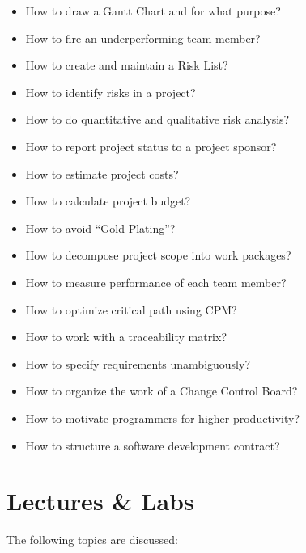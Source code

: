 \documentclass[nobrand,anonymous,nodate,nosecurity]{huawei}
\begin{document}
{\begin{itemize}
\item How to draw a Gantt Chart and for what purpose?
\item How to fire an underperforming team member?
\item How to create and maintain a Risk List?
\item How to identify risks in a project?
\item How to do quantitative and qualitative risk analysis?
\item How to report project status to a project sponsor?
\item How to estimate project costs?
\item How to calculate project budget?
\item How to avoid ``Gold Plating''?
\item How to decompose project scope into work packages?
\item How to measure performance of each team member?
\item How to optimize critical path using CPM?
\item How to work with a traceability matrix?
\item How to specify requirements unambiguously?
\item How to organize the work of a Change Control Board?
\item How to motivate programmers for higher productivity?
\item How to structure a software development contract?
\end{itemize}

\newpage
\section*{Lectures \& Labs}

The following topics are discussed:

}
\end{document}
